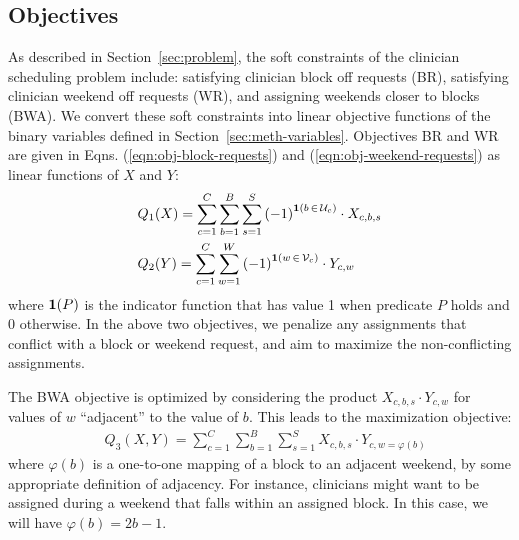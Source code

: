 \subsection{Objectives}\label{sec:meth-objectives}
As described in Section~\ref{sec:problem}, the soft constraints of the clinician
scheduling problem include: satisfying clinician block off requests (BR),
satisfying clinician weekend off requests (WR), and assigning weekends closer to
blocks (BWA). We convert these soft constraints into linear objective functions
of the binary variables defined in Section~\ref{sec:meth-variables}. 
Objectives BR and WR are given in Eqns. (\ref{eqn:obj-block-requests}) and (\ref{eqn:obj-weekend-requests})
as linear functions of $X$ and $Y$:
\begin{align}
&Q_1(X) = \sum_{c=1}^{C} \sum_{b=1}^{B} \sum_{s=1}^{S}
{(-1)}^{\bm{1}(b\,\in\,\mathcal{U}_c)}\cdot X_{c, b, s}
\label{eqn:obj-block-requests}\\
&Q_2(Y) = \sum_{c=1}^{C} \sum_{w=1}^{W}
{(-1)}^{\bm{1}(w\,\in\,\mathcal{V}_c)}\cdot Y_{c, w}
\label{eqn:obj-weekend-requests}
\end{align}
where $\bm{1}(P)$ is the indicator function that has value 1 when predicate $P$
holds and 0 otherwise. In the above two objectives, we penalize any assignments
that conflict with a block or weekend request, and aim to maximize the
non-conflicting assignments.

The BWA objective is optimized by considering the product $X_{c, b, s}\cdot Y_{c, w}$ 
for values of $w$ ``adjacent'' to the value of $b$. This
leads to the maximization objective:%
\begin{align}
&Q_3(X, Y) = \sum_{c=1}^{C} \sum_{b=1}^{B} \sum_{s=1}^{S} X_{c, b, s}\cdot Y_{c,
	w=\varphi(b)} \label{eqn:obj-block-weekend-adj}
\end{align}
where $\varphi(b)$ is a one-to-one mapping of a block to an adjacent weekend, by
some appropriate definition of adjacency. For instance, clinicians might want to
be assigned during a weekend that falls within an assigned block. In this case,
we will have $\varphi(b) = 2b-1$.


